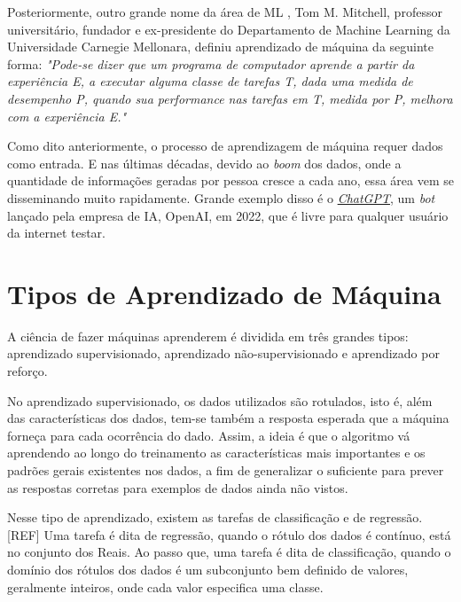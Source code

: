 Posteriormente, outro grande nome da área de \ac{ML}
, Tom M. Mitchell, professor universitário, fundador e ex-presidente do Departamento de Machine Learning da Universidade
Carnegie Mellonara, definiu aprendizado de máquina da seguinte forma: \textit{"Pode-se dizer que um programa de computador aprende a partir da experiência E, a executar alguma classe de tarefas T, dada uma medida de desempenho P, quando sua performance nas tarefas em T, medida por P, melhora com a experiência E."}\cite{machine_learning_tom_mitchell}

Como dito anteriormente, o processo de aprendizagem de máquina requer dados como entrada. E nas últimas décadas, devido ao \textit{boom} dos dados, onde a quantidade de informações geradas por pessoa cresce a cada ano, essa área vem se disseminando muito rapidamente. Grande exemplo disso é o \href{https://openai.com/blog/chatgpt}{\textit{ChatGPT}}, um \textit{bot} lançado pela empresa de IA, OpenAI, em 2022, que é livre para qualquer usuário da internet testar.



\section{Tipos de Aprendizado de Máquina}

A ciência de fazer máquinas aprenderem é dividida em três grandes tipos: aprendizado supervisionado, aprendizado não-supervisionado e aprendizado por reforço.

No aprendizado supervisionado, os dados utilizados são rotulados, isto é, além das características dos dados, tem-se também a resposta esperada que a máquina forneça para cada ocorrência do dado. Assim, a ideia é que o algoritmo vá aprendendo ao longo do treinamento as características mais importantes e os padrões gerais existentes nos dados, a fim de generalizar o suficiente para prever as respostas corretas para exemplos de dados ainda não vistos.

Nesse tipo de aprendizado, existem as tarefas de classificação e de regressão. [REF] Uma tarefa é dita de regressão, quando o rótulo dos dados é contínuo, está no conjunto dos Reais. Ao passo que, uma tarefa é dita de classificação, quando o domínio dos rótulos dos dados é um subconjunto bem definido de valores, geralmente inteiros, onde cada valor especifica uma classe.

